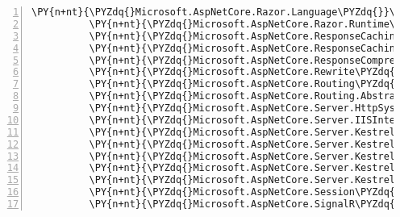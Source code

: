 \begin{Verbatim}[commandchars=\\\{\},numbers=left,firstnumber=1,stepnumber=1,numberblanklines=0]
          \PY{n+nt}{\PYZdq{}Microsoft.AspNetCore.Razor.Language\PYZdq{}}\PY{p}{:} \PY{l+s+s2}{\PYZdq{}2.1.0\PYZhy{}rc1\PYZhy{}final\PYZdq{}}\PY{p}{,}
          \PY{n+nt}{\PYZdq{}Microsoft.AspNetCore.Razor.Runtime\PYZdq{}}\PY{p}{:} \PY{l+s+s2}{\PYZdq{}2.1.0\PYZhy{}rc1\PYZhy{}final\PYZdq{}}\PY{p}{,}
          \PY{n+nt}{\PYZdq{}Microsoft.AspNetCore.ResponseCaching\PYZdq{}}\PY{p}{:} \PY{l+s+s2}{\PYZdq{}2.1.0\PYZhy{}rc1\PYZhy{}final\PYZdq{}}\PY{p}{,}
          \PY{n+nt}{\PYZdq{}Microsoft.AspNetCore.ResponseCaching.Abstractions\PYZdq{}}\PY{p}{:} \PY{l+s+s2}{\PYZdq{}2.1.0\PYZhy{}rc1\PYZhy{}final\PYZdq{}}\PY{p}{,}
          \PY{n+nt}{\PYZdq{}Microsoft.AspNetCore.ResponseCompression\PYZdq{}}\PY{p}{:} \PY{l+s+s2}{\PYZdq{}2.1.0\PYZhy{}rc1\PYZhy{}final\PYZdq{}}\PY{p}{,}
          \PY{n+nt}{\PYZdq{}Microsoft.AspNetCore.Rewrite\PYZdq{}}\PY{p}{:} \PY{l+s+s2}{\PYZdq{}2.1.0\PYZhy{}rc1\PYZhy{}final\PYZdq{}}\PY{p}{,}
          \PY{n+nt}{\PYZdq{}Microsoft.AspNetCore.Routing\PYZdq{}}\PY{p}{:} \PY{l+s+s2}{\PYZdq{}2.1.0\PYZhy{}rc1\PYZhy{}final\PYZdq{}}\PY{p}{,}
          \PY{n+nt}{\PYZdq{}Microsoft.AspNetCore.Routing.Abstractions\PYZdq{}}\PY{p}{:} \PY{l+s+s2}{\PYZdq{}2.1.0\PYZhy{}rc1\PYZhy{}final\PYZdq{}}\PY{p}{,}
          \PY{n+nt}{\PYZdq{}Microsoft.AspNetCore.Server.HttpSys\PYZdq{}}\PY{p}{:} \PY{l+s+s2}{\PYZdq{}2.1.0\PYZhy{}rc1\PYZhy{}final\PYZdq{}}\PY{p}{,}
          \PY{n+nt}{\PYZdq{}Microsoft.AspNetCore.Server.IISIntegration\PYZdq{}}\PY{p}{:} \PY{l+s+s2}{\PYZdq{}2.1.0\PYZhy{}rc1\PYZhy{}final\PYZdq{}}\PY{p}{,}
          \PY{n+nt}{\PYZdq{}Microsoft.AspNetCore.Server.Kestrel\PYZdq{}}\PY{p}{:} \PY{l+s+s2}{\PYZdq{}2.1.0\PYZhy{}rc1\PYZhy{}final\PYZdq{}}\PY{p}{,}
          \PY{n+nt}{\PYZdq{}Microsoft.AspNetCore.Server.Kestrel.Core\PYZdq{}}\PY{p}{:} \PY{l+s+s2}{\PYZdq{}2.1.0\PYZhy{}rc1\PYZhy{}final\PYZdq{}}\PY{p}{,}
          \PY{n+nt}{\PYZdq{}Microsoft.AspNetCore.Server.Kestrel.Https\PYZdq{}}\PY{p}{:} \PY{l+s+s2}{\PYZdq{}2.1.0\PYZhy{}rc1\PYZhy{}final\PYZdq{}}\PY{p}{,}
          \PY{n+nt}{\PYZdq{}Microsoft.AspNetCore.Server.Kestrel.Transport.Abstractions\PYZdq{}}\PY{p}{:} \PY{l+s+s2}{\PYZdq{}2.1.0\PYZhy{}rc1\PYZhy{}final\PYZdq{}}\PY{p}{,}
          \PY{n+nt}{\PYZdq{}Microsoft.AspNetCore.Server.Kestrel.Transport.Sockets\PYZdq{}}\PY{p}{:} \PY{l+s+s2}{\PYZdq{}2.1.0\PYZhy{}rc1\PYZhy{}final\PYZdq{}}\PY{p}{,}
          \PY{n+nt}{\PYZdq{}Microsoft.AspNetCore.Session\PYZdq{}}\PY{p}{:} \PY{l+s+s2}{\PYZdq{}2.1.0\PYZhy{}rc1\PYZhy{}final\PYZdq{}}\PY{p}{,}
          \PY{n+nt}{\PYZdq{}Microsoft.AspNetCore.SignalR\PYZdq{}}\PY{p}{:} \PY{l+s+s2}{\PYZdq{}1.0.0\PYZhy{}rc1\PYZhy{}final\PYZdq{}}\PY{p}{,}

\end{Verbatim}

